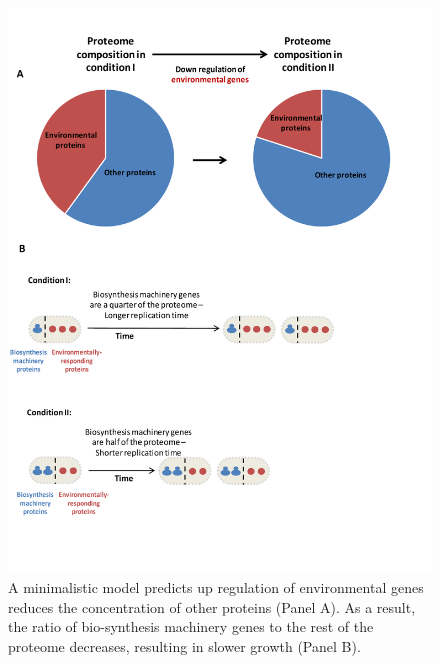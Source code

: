 \documentclass[notitlepage]{article}
\begin{document}
\begin{figure}[h]
\centering
\includegraphics[scale=0.8]{Figures7-trieste.pdf}
\caption{
  A minimalistic model predicts up regulation of environmental genes reduces the concentration of other proteins (Panel A).
As a result, the ratio of bio-synthesis machinery genes to the rest of the proteome decreases, resulting in slower growth (Panel B).
}
\label{fig:model}
\end{figure}
\end{document}
